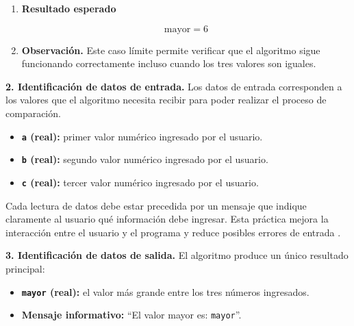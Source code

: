 \documentclass[12pt,twoside]{book}
\begin{document}
\begin{itemize}
\begin{enumerate}
								\item \textbf{Resultado esperado}
								
								\[
								\text{mayor} = 6
								\]
								
								\item \textbf{Observación.}  
								Este caso límite permite verificar que el algoritmo sigue funcionando correctamente incluso cuando los tres valores son iguales.
								
							\end{enumerate}
							
						\end{itemize}
						
						\noindent
						\textbf{2. Identificación de datos de entrada.}
						Los datos de entrada corresponden a los valores que el algoritmo necesita recibir para poder realizar el proceso de comparación.
						
						\begin{itemize}
							
							\item \textbf{\texttt{a} (real):} primer valor numérico ingresado por el usuario.
							
							\item \textbf{\texttt{b} (real):} segundo valor numérico ingresado por el usuario.
							
							\item \textbf{\texttt{c} (real):} tercer valor numérico ingresado por el usuario.
							
						\end{itemize}
						
						\noindent
						Cada lectura de datos debe estar precedida por un mensaje que indique claramente al usuario qué información debe ingresar. Esta práctica mejora la interacción entre el usuario y el programa y reduce posibles errores de entrada \cite{Gaddis2022Starting,Farrell2018Programming}.
						
						\noindent
						\textbf{3. Identificación de datos de salida.}
						El algoritmo produce un único resultado principal:
						
						\begin{itemize}
							
							\item \textbf{\texttt{mayor} (real):} el valor más grande entre los tres números ingresados.
							
							\item \textbf{Mensaje informativo:}  
							``El valor mayor es: \texttt{mayor}''.
							
						\end{itemize}
						
\end{document}
